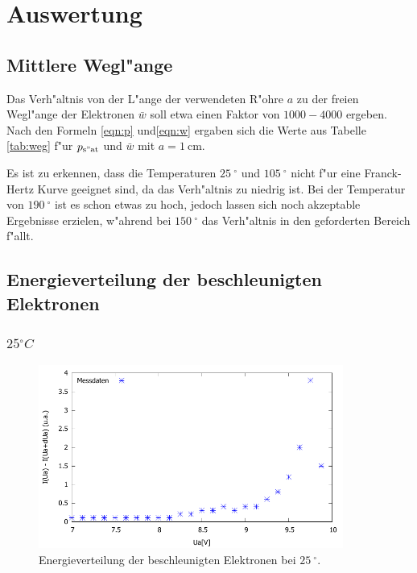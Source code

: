 \section{Auswertung}
\label{sec:auswertung}

\subsection{Mittlere Wegl"ange} %
\label{sub:mittlere_wegl_ange}



Das Verh"altnis von der L"ange der verwendeten R"ohre $a$ zu der freien Wegl"ange der Elektronen $\bar{w}$ soll etwa einen Faktor von $1000 - 4000$ ergeben.
Nach den Formeln \eqref{eqn:p} und\eqref{eqn:w} ergaben sich die Werte aus Tabelle \ref{tab:weg} f"ur $p_\mathrm{s"at}$ und $\bar{w}$ mit $a = \SI{1}{\centi\meter}$.

Es ist zu erkennen, dass die Temperaturen $\SI{25}{^\circ}$ und $\SI{105}{^\circ}$ nicht f"ur eine Franck-Hertz Kurve geeignet sind, da das Verh"altnis zu niedrig ist.
Bei der Temperatur von $\SI{190}{^\circ}$ ist es schon etwas zu hoch, jedoch lassen sich noch akzeptable Ergebnisse erzielen, w"ahrend bei $\SI{150}{^\circ}$ das Verh"altnis in den geforderten Bereich f"allt.

\clearpage

\subsection{Energieverteilung der beschleunigten Elektronen} %
\label{sub:energieverteilung_der_beschleunigten_elektronen}

\subsubsection{$\si{25}{^\circ C}$} %
\label{sub:_si}



\begin{figure}[!h]
	\centering
	\includegraphics[width = 10cm]{img/t20.pdf}
	\caption{Energieverteilung der beschleunigten Elektronen bei $\SI{25}{^\circ}$.}
	\label{gra:25}
\end{figure}

